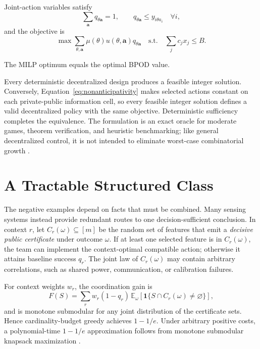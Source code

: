 Joint-action variables satisfy
\[
\sum_{\mathbf a}q_{\theta\mathbf a}=1,
\qquad
q_{\theta\mathbf a}\le y_{i\theta a_i}
\quad\forall i,
\]
and the objective is
\[
\max\sum_{\theta,\mathbf a}\mu(\theta)u(\theta,\mathbf a)q_{\theta\mathbf a}
\quad\text{s.t.}\quad
\sum_jc_jx_j\le B.
\]

\begin{theorem}\label{thm:milp}
The MILP optimum equals the optimal BPOD value.
\end{theorem}
Every deterministic decentralized design produces a feasible integer solution. Conversely, Equation~\eqref{eq:nonanticipativity} makes selected actions constant on each private-public information cell, so every feasible integer solution defines a valid decentralized policy with the same objective. Deterministic sufficiency completes the equivalence. The formulation is an exact oracle for moderate games, theorem verification, and heuristic benchmarking; like general decentralized control, it is not intended to eliminate worst-case combinatorial growth \cite{BernsteinEtAl2002}.

\section{A Tractable Structured Class}

The negative examples depend on facts that must be combined. Many sensing systems instead provide redundant routes to one decision-sufficient conclusion. In context $r$, let $C_r(\omega)\subseteq[m]$ be the random set of features that emit a \emph{decisive public certificate} under outcome $\omega$. If at least one selected feature is in $C_r(\omega)$, the team can implement the context-optimal compatible action; otherwise it attains baseline success $q_r$. The joint law of $C_r(\omega)$ may contain arbitrary correlations, such as shared power, communication, or calibration failures.

\begin{theorem}\label{thm:certificates}
For context weights $w_r$, the coordination gain is
\[
F(S)=\sum_r w_r(1-q_r)\,
\mathbb E_\omega\!\left[\mathbf 1\{S\cap C_r(\omega)\ne\varnothing\}\right],
\]
and is monotone submodular for any joint distribution of the certificate sets. Hence cardinality-budget greedy achieves $1-1/e$. Under arbitrary positive costs, a polynomial-time $1-1/e$ approximation follows from monotone submodular knapsack maximization \cite{Sviridenko2004}.
\end{theorem}

